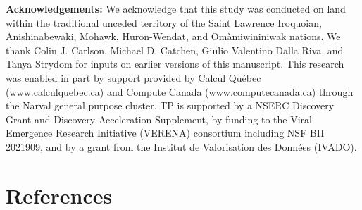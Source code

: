 \documentclass[10pt,oneside]{article}
\begin{document}
\textbf{Acknowledgements:} We acknowledge that this study was conducted
on land within the traditional unceded territory of the Saint Lawrence
Iroquoian, Anishinabewaki, Mohawk, Huron-Wendat, and Omàmiwininiwak
nations. We thank Colin J. Carlson, Michael D. Catchen, Giulio Valentino
Dalla Riva, and Tanya Strydom for inputs on earlier versions of this
manuscript. This research was enabled in part by support provided by
Calcul Québec (www.calculquebec.ca) and Compute Canada
(www.computecanada.ca) through the Narval general purpose cluster. TP is
supported by a NSERC Discovery Grant and Discovery Acceleration
Supplement, by funding to the Viral Emergence Research Initiative
(VERENA) consortium including NSF BII 2021909, and by a grant from the
Institut de Valorisation des Données (IVADO).

\hypertarget{references}{%
\section*{References}\label{references}}
\end{document}
